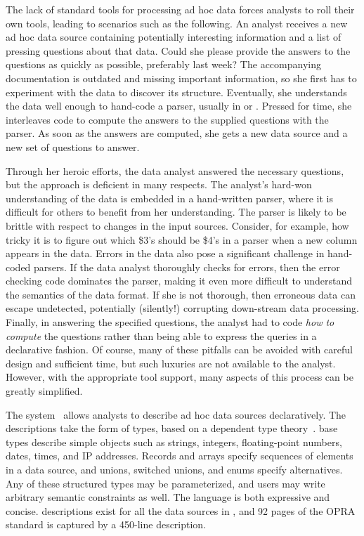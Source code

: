 The lack of standard tools for processing ad hoc data forces
analysts to roll their own tools, leading to scenarios such as the
following.  An analyst receives a new ad hoc data source containing
potentially interesting information and a list of pressing questions
about that data.  Could she please provide the answers to the
questions as quickly as possible, preferably last week?  The
accompanying documentation is outdated and missing important
information, so she first has to experiment with the data to discover
its structure.   Eventually, she understands the data well enough to hand-code a
parser, usually in \C{} or \perl{}.  Pressed for time, she interleaves
code to compute the answers to the supplied questions with the parser.
As soon as the answers are computed, she gets a new data source and a
new set of questions to answer.

Through her heroic efforts, the data analyst answered the necessary
questions, but the approach is deficient in many respects.  The
analyst's hard-won understanding of the data is embedded in a
hand-written parser, where it is difficult for others to benefit from
her understanding.  The parser is likely to be brittle with respect to
changes in the input sources.  Consider, for example, how tricky it is
to figure out which \$3's should be \$4's in a \perl{} parser when a
new column appears in the data.  Errors in the data also pose a
significant challenge in hand-coded parsers.  If the data analyst
thoroughly checks for errors, then the error checking code dominates
the parser, making it even more difficult to understand the semantics
of the data format.  If she is not thorough, then erroneous data can
escape undetected, potentially (silently!)  corrupting down-stream
data processing.  Finally, in
answering the specified questions, the analyst had to code \textit{how
to compute} the questions rather than being able to express the
queries in a declarative fashion.  Of course, many of these pitfalls
can be avoided with careful design and sufficient time, but such
luxuries are not available to the analyst.  However, with the
appropriate tool support, many aspects of this process can be greatly
simplified.

The \pads{} system~\cite{fisher+:pldi05} allows analysts to describe
ad hoc data sources declaratively.  The descriptions take the form of
types, based on a dependent type theory~\cite{fisher+:popl06}.
\pads{} base types describe simple objects such as strings,
integers, floating-point numbers, dates, times, and IP addresses.
Records and arrays specify sequences of elements in a data source, and
unions, switched unions, and enums specify alternatives.  Any of these
structured types may be parameterized, and users may write arbitrary
semantic constraints as well.  The \pads{} language is both expressive
and concise.  \pads{} descriptions exist for all the data sources in
, and 92 pages of the OPRA standard is
captured by a 450-line \pads{} description.

